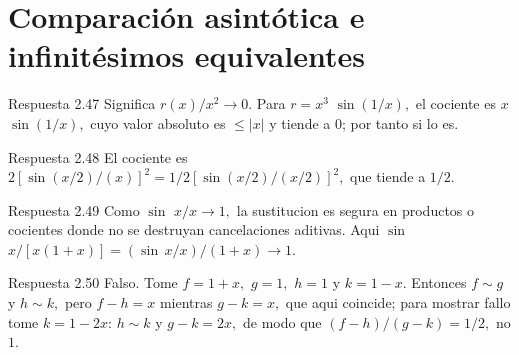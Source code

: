 \documentclass[10pt,a4paper,oneside,openany]{book}
\begin{document}
\section{Comparación asintótica e infinitésimos equivalentes}
\begin{PSevenAnswerFixed}{Respuesta 2.47}
Significa \(r(x)/x^{2}\to 0\). Para \(r=x^{3}\) \(\sin(1/x),\) el cociente es \(x\) \(\sin(1/x),\) cuyo valor absoluto es \(\le |x|\) y tiende a \(0\); por tanto si lo es.
\end{PSevenAnswerFixed}
\begin{PSevenAnswerFixed}{Respuesta 2.48}
El cociente es \(2[\sin(x/2)/(x)]^{2}=1/2[\sin(x/2)/(x/2)]^{2},\) que tiende a \(1/2\).
\end{PSevenAnswerFixed}
\begin{PSevenAnswerFixed}{Respuesta 2.49}
Como \(\sin\) \(x/x\to 1,\) la sustitucion es segura en productos o cocientes donde no se destruyan cancelaciones aditivas. Aqui \(\sin\) \(x/[x(1+x)]=(\sin\,x/x)/(1+x)\to 1\).
\end{PSevenAnswerFixed}
\begin{PSevenAnswerFixed}{Respuesta 2.50}
Falso. Tome \(f=1+x,\) \(g=1,\) \(h=1\) y \(k=1-x\). Entonces \(f\sim g\) y \(h\sim k,\) pero \(f-h=x\) mientras \(g-k=x,\) que aqui coincide; para mostrar fallo tome \(k=1-2x\): \(h\sim k\) y \(g-k=2x,\) de modo que \((f-h)/(g-k)=1/2,\) no \(1\).
\end{PSevenAnswerFixed}
\end{document}
